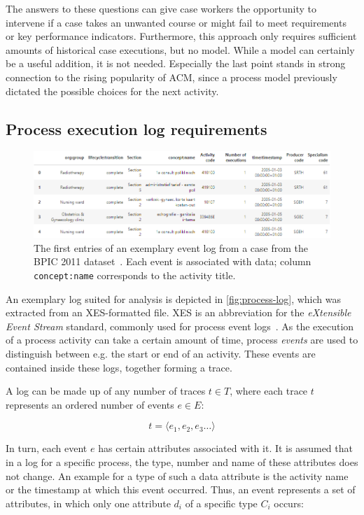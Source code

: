 The answers to these questions can give case workers the opportunity to intervene if a case takes an unwanted course or might fail to meet requirements or key performance indicators. Furthermore, this approach only requires sufficient amounts of historical case executions, but no model. While a model can certainly be a useful addition, it is not needed. Especially the last point stands in strong connection to the rising popularity of ACM, since a process model previously dictated the possible choices for the next activity.

\subsection{Process execution log requirements}\label{sec:log-structure}
\begin{figure}
    \centering
    \includegraphics[width=\textwidth]{gfx/process-log.png}
    \caption{The first entries of an exemplary event log from a case from the BPIC 2011 dataset~\cite{BPIC2011}. Each event is associated with data; column \texttt{concept:name} corresponds to the activity title.}
    \label{fig:process-log}
\end{figure}

An exemplary log suited for analysis is depicted in \autoref{fig:process-log}, which was extracted from an XES-formatted file.
XES is an abbreviation for the \textit{eXtensible Event Stream} standard, commonly used for process event logs~\cite{gunther2013xes}. As the execution of a process activity can take a certain amount of time, process \textit{events} are used to distinguish between e.g. the start or end of an activity. These events are contained inside these logs, together forming a trace.

A log can be made up of any number of traces $t \in T$, where each trace $t$ represents an ordered number of events $e \in E$:

$$ t = \langle e_1, e_2, e_3 \dots \rangle $$

In turn, each event $e$ has certain attributes associated with it. It is assumed that in a log for a specific process, the type, number and name of these attributes does not change. An example for a type of such a data attribute is the activity name or the timestamp at which this event occurred. Thus, an event represents a set of attributes, in which only one attribute $d_i$ of a specific type $C_i$ occurs:

